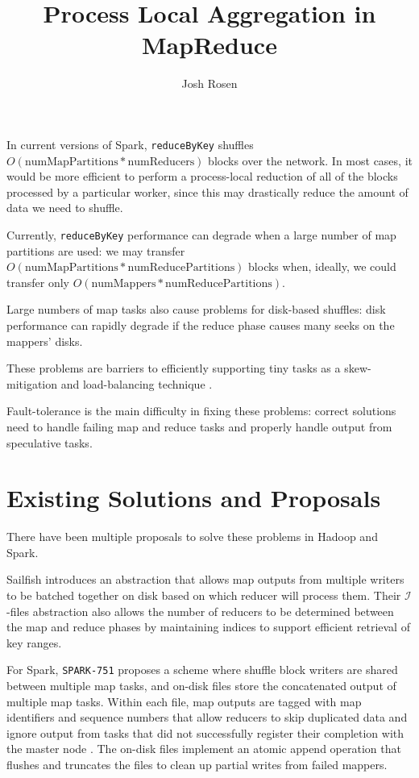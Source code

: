 \documentclass[12pt]{article}
\title{Process Local Aggregation in MapReduce}
\author{Josh Rosen}
\begin{document}
\maketitle

In current versions of Spark, \texttt{reduceByKey} shuffles
$O(\text{numMapPartitions} * \text{numReducers})$ blocks over the network.  In
most cases, it would be more efficient to perform a process-local reduction of
all of the blocks processed by a particular worker, since this may
drastically reduce the amount of data we need to shuffle.

Currently, \texttt{reduceByKey} performance can degrade when a large number of
map partitions are used: we may transfer $O(\text{numMapPartitions}
* \text{numReducePartitions})$ blocks when, ideally, we could transfer only
$O(\text{numMappers} * \text{numReducePartitions})$.

Large numbers of map tasks also cause problems for disk-based shuffles: disk
performance can rapidly degrade if the reduce phase causes many seeks on the
mappers' disks.

These problems are barriers to efficiently supporting tiny tasks as
a skew-mitigation and load-balancing technique \cite{tinytasks}.

Fault-tolerance is the main difficulty in fixing these problems: correct
solutions need to handle failing map and reduce tasks and properly handle
output from speculative tasks.

\section{Existing Solutions and Proposals}

There have been multiple proposals to solve these problems in Hadoop and Spark.

Sailfish \cite{sailfish} introduces an
abstraction that allows map outputs from multiple writers to be batched
together on disk based on which reducer will process them.  Their
$\mathcal{I}$-files abstraction also allows the number of reducers to be
determined between the map and reduce phases by maintaining indices to support
efficient retrieval of key ranges.

For Spark, \texttt{SPARK-751} \cite{SPARK-751} proposes a scheme where shuffle block
writers are shared between multiple map tasks, and on-disk files store the
concatenated output of multiple map tasks.  Within each file, map outputs are
tagged with map identifiers and sequence numbers that allow reducers to skip
duplicated data and ignore output from tasks that did not successfully
register their completion with the master node .  The on-disk files implement
an atomic append operation that flushes and truncates the files to clean up
partial writes from failed mappers.
\end{document}
